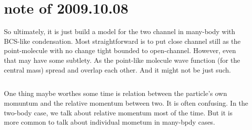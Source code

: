 \section{note of 2009.10.08}
So ultimately, it is just build a model for the two channel in many-body with BCS-like condensation.  Most straightforward is to put close channel still as the point-molecule with no change tight bounded to open-channel.  However, even that may have some subtlety. As the point-like molecule wave function (for the central mass) spread and overlap each other. And it might not be just such.   

\subsection{}
One thing maybe worthes some time is relation between the particle's own momuntum and the relative momentum between two.  It is often confusing.  In the two-body case, we talk about relative momentum most of the time.  But it is more common to talk about individual mometum in many-bpdy cases.  
